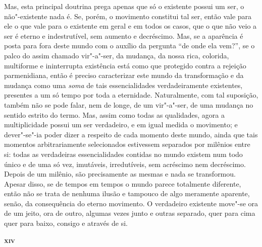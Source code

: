Mas, esta principal doutrina prega apenas que só o existente possui um ser, o
não"-existente nada é. Se, porém, o movimento constitui tal ser, então vale
para ele o que vale para o existente em geral e em todos os casos, que o que
não veio a ser é eterno e indestrutível, sem aumento e decréscimo. Mas, se a
aparência é posta para fora deste mundo com o auxílio da pergunta ``de onde
ela vem?'', se o palco do assim chamado vir"-a"-ser, da mudança, da nossa
rica, colorida, multiforme e ininterrupta existência está como que protegido
contra a rejeição parmenidiana, então é preciso caracterizar este mundo da
transformação e da mudança como uma \textit{soma} de tais essencialidades 
verdadeiramente existentes, presentes a
 um só tempo por toda a eternidade. Naturalmente, com tal suposição, também
 não se pode falar, nem de longe, de um vir"-a"-ser, de uma mudança no
 sentido estrito do termo. Mas, assim como todas as qualidades, agora a
 multiplicidade possui um ser verdadeiro, e em igual medida o movimento; e
 dever"-se"-ia poder dizer a respeito de cada momento deste mundo, ainda que
 tais momentos arbitrariamente selecionados estivessem separados por milênios
 entre si: todas as verdadeiras essencialidades contidas no mundo existem num
 todo único e de uma só vez, imutáveis, irredutíveis, sem acréscimo nem
 decréscimo. Depois de um milênio, são precisamente as mesmas e nada se
 transformou. Apesar disso, se de tempos em tempos o mundo parece totalmente
 diferente, então não se trata de nenhuma ilusão e tampouco de algo meramente
 aparente, senão, da consequência do eterno movimento. O verdadeiro existente
 move"-se ora de um jeito, ora de outro, algumas vezes junto e outras
 separado, quer para cima quer para baixo, consigo e através de si.

\bigskip
\textsc{\textbf{xiv}}
\bigskip


